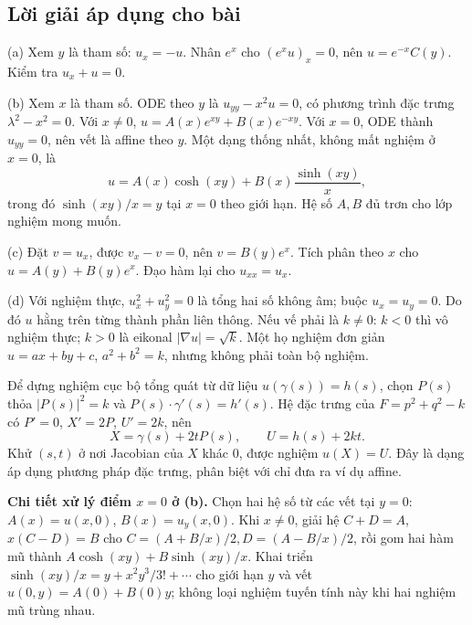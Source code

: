 \documentclass[10pt,a4paper]{article}
\begin{document}
\subsection*{Lời giải áp dụng cho bài}
(a) Xem $y$ là tham số: $u_x=-u$. Nhân $e^x$ cho $(e^xu)_x=0$, nên $u=e^{-x}C(y)$. Kiểm tra $u_x+u=0$.

(b) Xem $x$ là tham số. ODE theo $y$ là $u_{yy}-x^2u=0$, có phương trình đặc trưng $\lambda^2-x^2=0$. Với $x\ne0$, $u=A(x)e^{xy}+B(x)e^{-xy}$. Với $x=0$, ODE thành $u_{yy}=0$, nên vết là affine theo $y$. Một dạng thống nhất, không mất nghiệm ở $x=0$, là
\[u=A(x)\cosh(xy)+B(x)\frac{\sinh(xy)}x,\]
trong đó $\sinh(xy)/x=y$ tại $x=0$ theo giới hạn. Hệ số $A,B$ đủ trơn cho lớp nghiệm mong muốn.

(c) Đặt $v=u_x$, được $v_x-v=0$, nên $v=B(y)e^x$. Tích phân theo $x$ cho $u=A(y)+B(y)e^x$. Đạo hàm lại cho $u_{xx}=u_x$.

(d) Với nghiệm thực, $u_x^2+u_y^2=0$ là tổng hai số không âm; buộc $u_x=u_y=0$. Do đó $u$ hằng trên từng thành phần liên thông. Nếu vế phải là $k\ne0$: $k<0$ thì vô nghiệm thực; $k>0$ là eikonal $|\nabla u|=\sqrt k$. Một họ nghiệm đơn giản $u=ax+by+c$, $a^2+b^2=k$, nhưng không phải toàn bộ nghiệm.

Để dựng nghiệm cục bộ tổng quát từ dữ liệu $u(\gamma(s))=h(s)$, chọn $P(s)$ thỏa $|P(s)|^2=k$ và $P(s)\cdot\gamma'(s)=h'(s)$. Hệ đặc trưng của $F=p^2+q^2-k$ có $P'=0$, $X'=2P$, $U'=2k$, nên
\[X=\gamma(s)+2tP(s),\qquad U=h(s)+2kt.\]
Khử $(s,t)$ ở nơi Jacobian của $X$ khác 0, được nghiệm $u(X)=U$. Đây là dạng áp dụng phương pháp đặc trưng, phân biệt với chỉ đưa ra ví dụ affine.

\textbf{Chi tiết xử lý điểm $x=0$ ở (b).} Chọn hai hệ số từ các vết tại $y=0$: $A(x)=u(x,0)$, $B(x)=u_y(x,0)$. Khi $x\ne0$, giải hệ $C+D=A$, $x(C-D)=B$ cho $C=(A+B/x)/2,D=(A-B/x)/2$, rồi gom hai hàm mũ thành $A\cosh(xy)+B\sinh(xy)/x$. Khai triển $\sinh(xy)/x=y+x^2y^3/3!+\cdots$ cho giới hạn $y$ và vết $u(0,y)=A(0)+B(0)y$; không loại nghiệm tuyến tính này khi hai nghiệm mũ trùng nhau.
\end{document}
